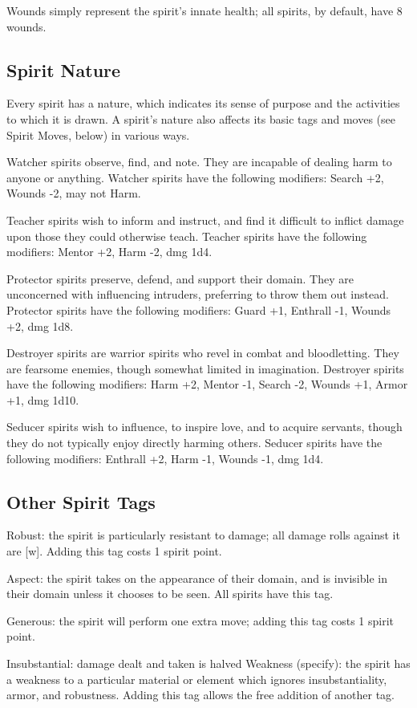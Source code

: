 Wounds simply represent the spirit’s innate health; all spirits, by default, have 8 wounds.


\subsection{Spirit Nature}
Every spirit has a nature, which indicates its sense of purpose and the activities to which it is drawn. A spirit’s nature also affects its basic tags and moves (see Spirit Moves, below) in various ways.

Watcher spirits observe, find, and note. They are incapable of dealing harm to anyone or anything. Watcher spirits have the following modifiers: Search +2, Wounds -2, may not Harm.

Teacher spirits wish to inform and instruct, and find it difficult to inflict damage upon those they could otherwise teach. Teacher spirits have the following modifiers: Mentor +2, Harm -2, dmg 1d4.

Protector spirits preserve, defend, and support their domain. They are unconcerned with influencing intruders, preferring to throw them out instead. Protector spirits have the following modifiers: Guard +1, Enthrall -1, Wounds +2, dmg 1d8.

Destroyer spirits are warrior spirits who revel in combat and bloodletting. They are fearsome enemies, though somewhat limited in imagination. Destroyer spirits have the following modifiers: Harm +2, Mentor -1, Search -2, Wounds +1, Armor +1, dmg 1d10.

Seducer spirits wish to influence, to inspire love, and to acquire servants, though they do not typically enjoy directly harming others. Seducer spirits have the following modifiers: Enthrall +2, Harm -1, Wounds -1, dmg 1d4.


\subsection{Other Spirit Tags}
Robust: the spirit is particularly resistant to damage; all damage rolls against it are [w]. Adding this tag costs 1 spirit point.

Aspect: the spirit takes on the appearance of their domain, and is invisible in their domain unless it chooses to be seen. All spirits have this tag.

Generous: the spirit will perform one extra move; adding this tag costs 1 spirit point.

Insubstantial: damage dealt and taken is halved Weakness (specify): the spirit has a weakness to a particular material or element which ignores insubstantiality, armor, and robustness. Adding this tag allows the free addition of another tag.

